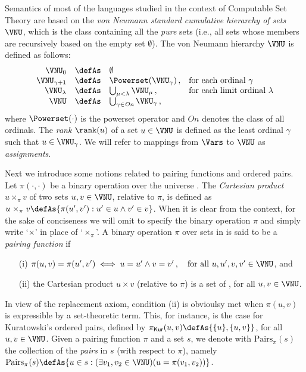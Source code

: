 \documentclass[submission,copyright,creativecommons]{eptcs}
\newcommand{\myTimes}{\mathrel{\times_{\pi}}}
\newcommand{\pairs}[2]{\mathrm{Pairs}_{\pi^{#1}}(#2)}
\newcommand{\sx}{u}
\newcommand{\sy}{v}
\begin{document}
Semantics of most of the languages studied in the context of
Computable Set Theory are based on the \emph{von Neumann standard
cumulative hierarchy of sets} $\VNU$, which is the class containing
all the \emph{pure} sets (i.e., all sets whose members are recursively
based on the empty set $\emptyset$).  The von Neumann hierarchy $\VNU$
is defined as follows:
\[
\begin{array}{rcll}
  \VNU_0          & \defAs & \emptyset
\\
  \VNU_{\gamma+1} & \defAs & \Powerset(\VNU_\gamma) \,,
  & \textrm{for each ordinal $\gamma$}
\\
  \VNU_\lambda    & \defAs & \bigcup_{\mu < \lambda} \VNU_\mu
  \,,& \textrm{for each limit ordinal $\lambda$}
\\
  \VNU & \defAs & \bigcup_{\gamma \in \mathit{On}} \VNU_{\gamma} \,,
\end{array}
\]
where $\Powerset(\cdot)$ is the powerset operator and
$\mathit{On}$ denotes the class of all ordinals. 
The \emph{rank}
$\rank(u)$ of a set $u \in \VNU$ is defined as the least ordinal
$\gamma$ such that $u \in \VNU_{\gamma}$.
We will refer to mappings from 
$\Vars$ to $\VNU$ as \emph{assignments}.

Next we introduce some notions related to pairing functions and
ordered pairs.
Let $\pi(\cdot, \cdot)$ be a binary operation over the universe \VNU.
The \emph{Cartesian product} $\sx \myTimes \sy$ of two sets $\sx, \sy \in
\VNU$, relative to $\pi$, is defined as
$\sx \myTimes \sy \defAs \{ \pi(\sx',\sy') : \sx' \in \sx \wedge \sy' \in \sy\}$.
When it is clear from the context, for the sake of conciseness we
will omit to specify the binary operation $\pi$ and simply write 
`$\times$' in place of `$\myTimes$'.
A binary operation $\pi$ over sets in \VNU  is said to be a 
\emph{pairing function} if
\begin{itemize}
    \item[(i)] 
    $\pi(\sx,\sy)=\pi(\sx',\sy') \iff \sx=\sx' \wedge \sy=\sy'\,, \quad \text{for
    all~} u,u',v,v' \in \VNU$, and

    \item[(ii)] the Cartesian product $\sx \times \sy$ (relative to
    $\pi$) is a set of \VNU, for all $\sx,\sy \in \VNU$.
\end{itemize}
In view of the replacement axiom, condition (ii) is obvioulsy met 
when $\pi(\sx,\sy)$ is expressible by a set-theoretic term. This, for 
instance, is the case for Kuratowski's ordered pairs, defined by 
$\pi_{\mathsf{Kur}}(\sx, \sy) \defAs \{ \{\sx\}, \{\sx, \sy\}\}$,
for all $\sx, \sy \in \VNU$.
Given a pairing function $\pi$ and a set $s$, we denote with
$\pairs{}{s}$ the collection of the \emph{pairs} in $s$ (with respect
to $\pi$), namely
$ \pairs{}{s} \defAs \{ u \in s : (\exists v_1, v_2 \in \VNU)(u =
 \pi(v_1,v_2)) \}$.
\end{document}
